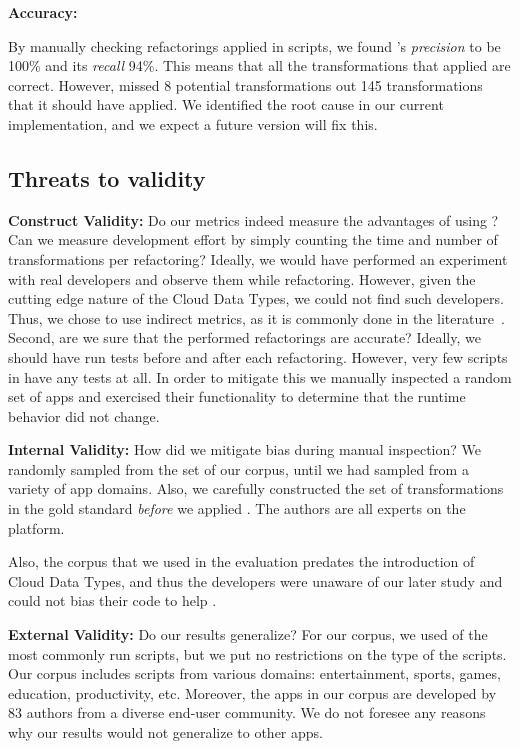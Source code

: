 \documentclass[article]{sigplanconf}
\begin{document}
\textbf{Accuracy:}

By manually checking refactorings applied in \numManual scripts, we found \tool's \emph{precision} to be 100\% and its \emph{recall} 94\%. This means that all the transformations that \tool applied are correct. However, \tool missed 8 potential transformations out 145 transformations that it should have applied. We identified the root cause in our current implementation, and we expect a future version will fix this. 

\subsection{Threats to validity}
\textbf{Construct Validity:}  Do our metrics indeed measure the advantages of using \tool? Can we measure development effort by simply counting the time and number of transformations per refactoring? Ideally, we would have performed an experiment with real \TD developers and observe them while refactoring. However, given the cutting edge nature of the Cloud Data Types, we could not find such developers. Thus, we chose to use indirect metrics, as it is commonly done in the literature~\cite{Gyori:Lambdaficator,Wloka:Reentrancer}. 
Second, are we sure that the performed refactorings are accurate? Ideally, we should have run tests before and after each refactoring. However, very few scripts in \TD have any tests at all. In order to mitigate this we manually inspected a random set of \numManual apps and exercised their functionality to determine that the runtime behavior did not change.

\textbf{Internal Validity:}  How did we mitigate bias during manual inspection? We randomly sampled from the set of our corpus, until we had sampled from a variety of app domains. Also, we carefully constructed the set of transformations in the gold standard \emph{before} we applied \tool. The authors are all experts on the \TD platform.

Also, the corpus that we used in the evaluation predates the introduction of Cloud Data Types, and thus the developers were unaware of our later study and could not bias their code to help \tool. 

\textbf{External Validity:}  Do our results generalize? For our corpus, we used \numScripts of the most commonly run scripts, but we put no restrictions on the type of the scripts.  Our corpus includes scripts from various domains: entertainment, sports, games, education, productivity, etc. Moreover, the apps in our corpus are developed by 83 authors from a diverse end-user community. We do not foresee any reasons why our results would not generalize to other \TD apps.  
\end{document}
